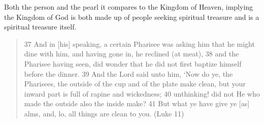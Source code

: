 \documentclass[11pt]{article}
\begin{document}
Both the person and the pearl it compares to the Kingdom of Heaven, implying the Kingdom of God is both made up of people seeking spiritual treasure and is a spiritual treasure itself. 
\begin{quote}
37 And in [his] speaking, a certain Pharisee was asking him that he might dine with him, and having gone in, he reclined (at meat),
38 and the Pharisee having seen, did wonder that he did not first baptize himself before the dinner.
39 And the Lord said unto him, `Now do ye, the Pharisees, the outside of the cup and of the plate make clean, but your inward part is full of rapine and wickedness;
40 unthinking! did not He who made the outside also the inside make?
41 But what ye have give ye [as] alms, and, lo, all things are clean to you. (Luke 11)
\end{quote}
\end{document}
